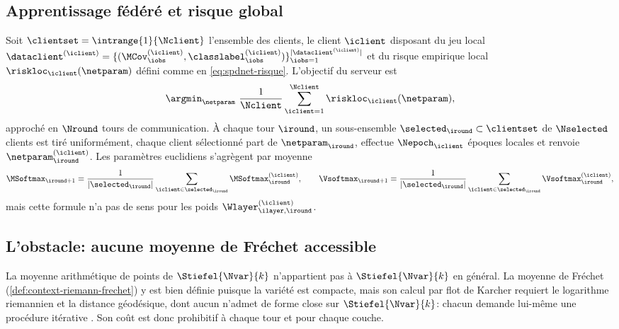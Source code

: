 \subsection{Apprentissage fédéré et risque global}
\label{sec:spdnet-federe-probleme}

Soit $\clientset=\intrange{1}{\Nclient}$ l'ensemble des clients, le client
$\iclient$ disposant du jeu local
$\dataclient^{(\iclient)}=\{(\MCov_\iobs^{(\iclient)},\classlabel_\iobs^{(\iclient)})\}_{\iobs=1}^{|\dataclient^{(\iclient)}|}$
et du risque empirique local $\riskloc_\iclient(\netparam)$ défini comme en
\cref{eq:spdnet-risque}. L'objectif du serveur est
\begin{equation}
  \argmin_{\netparam}\ \frac{1}{\Nclient}\sum_{\iclient=1}^{\Nclient}\riskloc_\iclient(\netparam),
  \label{eq:spdnet-federe-risque}
\end{equation}
approché en $\Nround$ tours de communication. À chaque tour $\iround$, un
sous-ensemble $\selected_\iround\subset\clientset$ de $\Nselected$ clients est
tiré uniformément, chaque client sélectionné part de $\netparam_\iround$,
effectue $\Nepoch_\iclient$ époques locales et renvoie
$\netparam_\iround^{(\iclient)}$. Les paramètres euclidiens s'agrègent par
moyenne 
\begin{equation}
  \MSoftmax_{\iround+1}=\frac{1}{|\selected_\iround|}\sum_{\iclient\in\selected_\iround}\MSoftmax_\iround^{(\iclient)},
  \qquad
  \Vsoftmax_{\iround+1}=\frac{1}{|\selected_\iround|}\sum_{\iclient\in\selected_\iround}\Vsoftmax_\iround^{(\iclient)},
  \label{eq:spdnet-federe-euclidien}
\end{equation}
mais cette formule n'a pas de sens pour les poids $\Wlayer_{\ilayer,\iround}^{(\iclient)}$.

\subsection{L'obstacle: aucune moyenne de Fréchet accessible}
\label{sec:spdnet-federe-obstacle}

\begin{property}
\label{prop:spdnet-federe-obstacle}
  La moyenne arithmétique de points de $\Stiefel{\Nvar}{k}$ n'appartient pas à
  $\Stiefel{\Nvar}{k}$ en général. La moyenne de Fréchet
  (\cref{def:context-riemann-frechet}) y est bien définie puisque la variété est
  compacte, mais son calcul par flot de Karcher requiert le logarithme
  riemannien et la distance géodésique, dont aucun n'admet de forme close sur
  $\Stiefel{\Nvar}{k}$: chacun demande lui-même une procédure itérative
  . Son coût est donc
  prohibitif à chaque tour et pour chaque couche.
\end{property}

